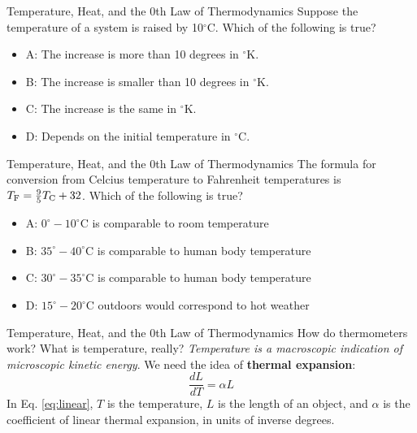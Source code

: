 \documentclass{beamer}
\begin{document}
\begin{frame}{Temperature, Heat, and the 0th Law of Thermodynamics}
Suppose the temperature of a system is raised by 10$^{\circ}$C.  Which of the following is true?
\begin{itemize}
\item A: The increase is more than 10 degrees in $^{\circ}$K.
\item B: The increase is smaller than 10 degrees in $^{\circ}$K.
\item C: The increase is the same in $^{\circ}$K.
\item D: Depends on the initial temperature in $^{\circ}$C.
\end{itemize}
\end{frame}

\begin{frame}{Temperature, Heat, and the 0th Law of Thermodynamics}
The formula for conversion from Celcius temperature to Fahrenheit temperatures is $T_{\rm F} = \frac{9}{5}T_{\rm C} + 32$.  Which of the following is true?
\begin{itemize}
\item A: $0^{\circ}-10^{\circ}$C is comparable to room temperature
\item B: $35^{\circ}-40^{\circ}$C is comparable to human body temperature
\item C: $30^{\circ}-35^{\circ}$C is comparable to human body temperature
\item D: $15^{\circ}-20^{\circ}$C outdoors would correspond to hot weather
\end{itemize}
\end{frame}

\begin{frame}{Temperature, Heat, and the 0th Law of Thermodynamics}
How do thermometers work?  What is temperature, really?  \textit{Temperature is a macroscopic indication of microscopic kinetic energy}.  We need the idea of \textbf{thermal expansion}: \\ 
\begin{equation}
\frac{dL}{dT} = \alpha L
\label{eq:linear}
\end{equation}
In Eq. \ref{eq:linear}, $T$ is the temperature, $L$ is the length of an object, and $\alpha$ is the coefficient of linear thermal expansion, in units of inverse degrees.
\end{frame}
\end{document}
